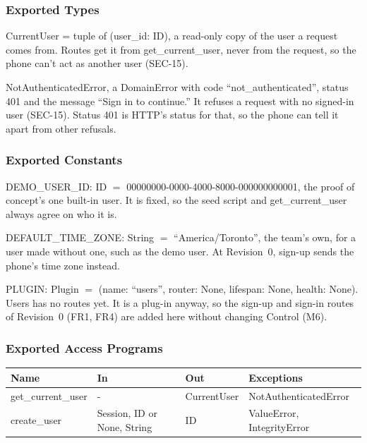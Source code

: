 \documentclass[12pt, titlepage]{article}
\begin{document}
\subsubsection{Exported Types}

\noindent CurrentUser = tuple of (user\_id: ID), a read-only copy of the user a
request comes from. Routes get it from get\_current\_user, never from the
request, so the phone can't act as another user (SEC-15).

\medskip
\noindent NotAuthenticatedError, a DomainError with code
``not\_authenticated'', status 401 and the message ``Sign in to continue.''
It refuses a request with no signed-in user (SEC-15). Status 401 is HTTP's
status for that, so the phone can tell it apart from other refusals.

\subsubsection{Exported Constants}

\noindent DEMO\_USER\_ID: ID $=$ 00000000-0000-4000-8000-000000000001, the
proof of concept's one built-in user. It is fixed, so the seed script and
get\_current\_user always agree on who it is.

\medskip
\noindent DEFAULT\_TIME\_ZONE: String $=$ ``America/Toronto'', the team's own,
for a user made without one, such as the demo user. At Revision~0, sign-up
sends the phone's time zone instead.

\medskip
\noindent PLUGIN: Plugin $=$ (name: ``users'', router: None, lifespan: None,
health: None). Users has no routes yet. It is a plug-in anyway, so the sign-up
and sign-in routes of Revision~0 (FR1, FR4) are added here without changing
Control (M6).

\subsubsection{Exported Access Programs}

\begin{center}
\begin{tabular}{>{\raggedright\arraybackslash}p{3.6cm}
  >{\raggedright\arraybackslash}p{4.4cm}
  >{\raggedright\arraybackslash}p{2.4cm}
  >{\raggedright\arraybackslash}p{4.4cm}}
\toprule
\textbf{Name} & \textbf{In} & \textbf{Out} & \textbf{Exceptions} \\
\midrule
get\_current\_user & - & CurrentUser & NotAuthenticatedError \\
create\_user & Session, ID or None, String & ID & ValueError, IntegrityError \\
\bottomrule
\end{tabular}
\end{center}
\end{document}
